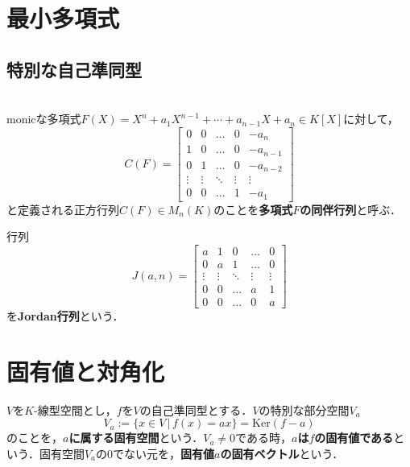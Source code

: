 \documentclass[uplatex, 12pt, dvipdfmx]{jsreport}
\begin{document}
\section{最小多項式}

\subsection{特別な自己準同型}

\begin{definition}　\\
    \rm{}monicな多項式$F(X) = X^n+a_1X^{n-1}+\cdots +a_{n-1}X+a_n \in K[X]$に対して，
        $$C(F)=\begin{bmatrix}
        0 & 0 & \dots & 0 & -a_n \\
        1 & 0 & \dots & 0 & -a_{n-1} \\
        0 & 1 & \dots & 0 & -a_{n-2} \\
        \vdots & \vdots & \ddots & \vdots & \vdots \\
        0 & 0 & \dots & 1 & -a_1
        \end{bmatrix}$$
    と定義される正方行列$C(F)\in M_n(K)$のことを\textbf{多項式$F$の同伴行列}と呼ぶ．
\end{definition}
\begin{definition}
        行列
        \[J(a,n)=\begin{bmatrix}
        a & 1 & 0 & \dots & 0 \\
        0 & a & 1 & \dots & 0 \\
        \vdots & \vdots & \ddots & \vdots & \vdots \\
        0 & 0 & \dots & a & 1 \\
        0 & 0 & \dots & 0 & a
        \end{bmatrix}\]
    を\textbf{Jordan行列}という．
\end{definition}

\section{固有値と対角化}
\begin{definition}
    $V$を$K$-線型空間とし，$f$を$V$の自己準同型とする．$V$の特別な部分空間$V_a$
    $$V_a := \{ x\in V \,|\, f(x)=ax \} = \mathrm{Ker} (f-a)$$
    のことを，\textbf{$a$に属する固有空間}という．$V_a\ne 0$である時，\textbf{$a$は$f$の固有値である}という．固有空間$V_a$の$0$でない元を，\textbf{固有値$a$の固有ベクトル}という．
\end{definition}
\end{document}
